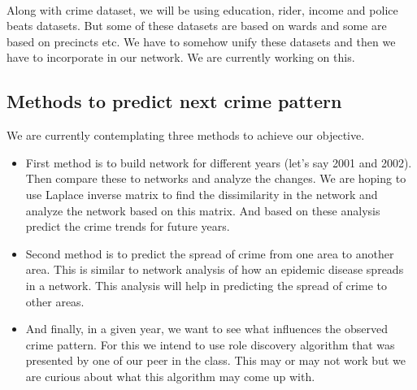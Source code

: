 \documentclass{article}
\begin{document}
\paragraph{}
Along with crime dataset, we will be using education, rider, income and police beats datasets. But some of these datasets are based on wards and some are based on precincts etc. We have to somehow unify these datasets and then we have to incorporate in our network. We are currently working on this.
\subsection{Methods to predict next crime pattern}
We are currently contemplating three methods to achieve our objective. 
\begin{itemize}
\item First method is to build network for different years (let's say 2001 and 2002). Then compare these to networks and analyze the changes. We are hoping to use Laplace inverse matrix\cite{rwalk} to find the dissimilarity in the network and analyze the network based on this matrix. And based on these analysis predict the crime trends for future years.
\item Second method is to predict the spread of crime from one area to another area. This is similar to network analysis of how an epidemic disease spreads in a network\cite{spread}. This analysis will help in predicting the spread of crime to other areas.
\item And finally, in a given year, we want to see what influences the observed crime pattern. For this we intend to use role discovery algorithm that was presented by one of our peer in the class. This may or may not work but we are curious about what this algorithm may come up with.
\end{itemize}
\end{document}
